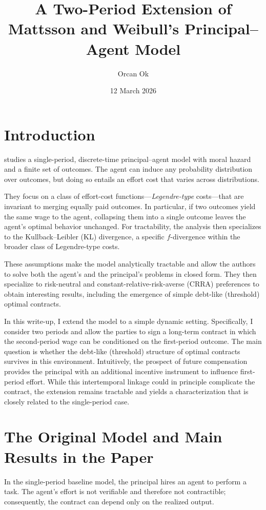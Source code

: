 \documentclass[12pt]{article}
\title{A Two-Period Extension of Mattsson and Weibull's Principal--Agent Model}
\author{Orcan Ok}
\date{12 March 2026}
\theoremstyle{definition}
\begin{document}
\maketitle

\section{Introduction}

\cite{mattsson_weibull_2023} studies a single-period,
discrete-time principal–agent model with moral hazard and a finite set of outcomes. The agent can induce any probability distribution over outcomes, but doing so entails an effort cost that varies across distributions.

They focus on a class of effort-cost functions—\emph{Legendre-type} costs—that are invariant to merging equally paid outcomes. In particular,
if two outcomes yield the same wage to the agent, collapsing them into a single outcome leaves the agent’s optimal behavior unchanged.
For tractability, the analysis then specializes to the Kullback–Leibler (KL) divergence, a specific $f$-divergence within the broader class of Legendre-type costs.

These assumptions make the model analytically tractable and allow the authors to solve both the agent’s and the principal’s problems in closed
form. They then specialize to risk-neutral and constant-relative-risk-averse (CRRA) preferences to obtain interesting results, including the emergence of simple debt-like (threshold) optimal contracts.

In this write-up, I extend the model to a simple dynamic setting. Specifically, I consider two periods and allow the parties to sign a
long-term contract in which the second-period wage can be conditioned on the first-period outcome. The main question is whether the
debt-like (threshold) structure of optimal contracts survives in this environment. Intuitively, the prospect of future compensation
provides the principal with an additional incentive instrument to influence first-period effort. While this intertemporal linkage
could in principle complicate the contract, the extension remains tractable and yields a characterization that is closely related to the single-period case.

\section{The Original Model and Main Results in the Paper}
In the single-period baseline model, the principal hires an agent to perform a task. The agent’s effort is not verifiable and therefore not contractible; consequently, the contract can depend only on the realized output.
\end{document}
